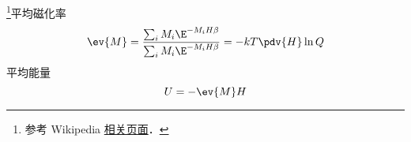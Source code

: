 
\begin{issues}
\issueDraft
\issueMissDepend
\end{issues}

\footnote{参考 Wikipedia \href{https://en.wikipedia.org/wiki/Ising_model}{相关页面}．}平均磁化率
\begin{equation}
\ev{M} = \frac{\sum_i M_i \E^{-M_i H \beta}}{\sum_i M_i \E^{-M_i H\beta}} = -kT \pdv{H} \ln Q
\end{equation}
平均能量
\begin{equation}
U = - \ev{M} H
\end{equation}
